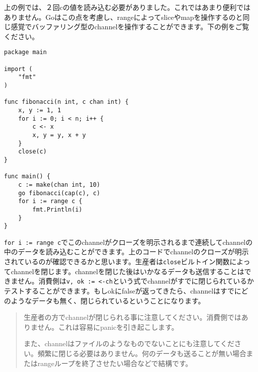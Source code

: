 上の例では、２回cの値を読み込む必要がありました。これではあまり便利ではありません。Goはこの点を考慮し、rangeによってsliceやmapを操作するのと同じ感覚でバッファリング型のchannelを操作することができます。下の例をご覧ください。


\begin{lstlisting}[numbers=none]
package main

import (
    "fmt"
)

func fibonacci(n int, c chan int) {
    x, y := 1, 1
    for i := 0; i < n; i++ {
        c <- x
        x, y = y, x + y
    }
    close(c)
}

func main() {
    c := make(chan int, 10)
    go fibonacci(cap(c), c)
    for i := range c {
        fmt.Println(i)
    }
}
\end{lstlisting}

\texttt{for i := range c}でこのchannelがクローズを明示されるまで連続してchannelの中のデータを読み込むことができます。上のコードでchannelのクローズが明示されているのが確認できるかと思います。生産者は\texttt{close}ビルトイン関数によってchannelを閉じます。channelを閉じた後はいかなるデータも送信することはできません。消費側は\texttt{v, ok := <-ch}という式でchannelがすでに閉じられているかテストすることができます。もしokにfalseが返ってきたら、channelはすでにどのようなデータも無く、閉じられているということになります。

\begin{quote}
生産者の方でchannelが閉じられる事に注意してください。消費側ではありません。これは容易にpanicを引き起こします。

また、channelはファイルのようなものでないことにも注意してください。頻繁に閉じる必要はありません。何のデータも送ることが無い場合またはrangeループを終了させたい場合などで結構です。
\end{quote}
